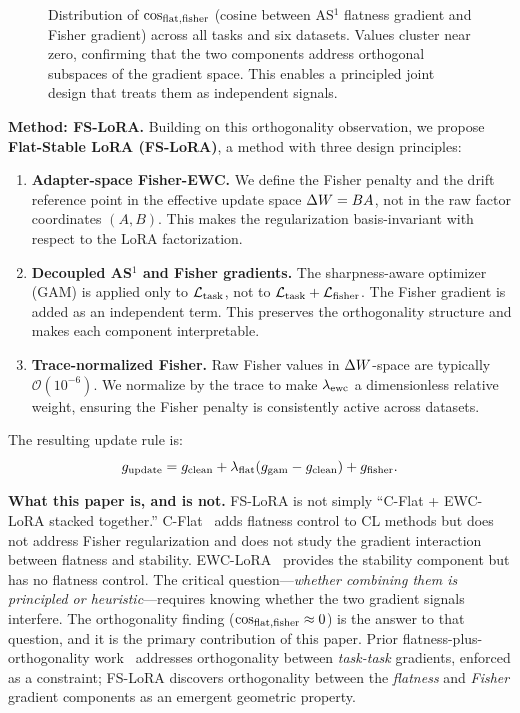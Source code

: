 \begin{figure}[t]
\centering
\fbox{\rule[-.5cm]{0cm}{4cm} \rule[-.5cm]{8cm}{0cm}}
\caption{Distribution of $\cos_{\mathrm{flat,fisher}}$ (cosine between AS$^1$ flatness gradient and Fisher gradient)
across all tasks and six datasets. Values cluster near zero, confirming that the two components
address orthogonal subspaces of the gradient space. This enables a principled joint design
that treats them as independent signals.}
\label{fig:cosine_histogram}
\end{figure}

\textbf{Method: FS-LoRA.}
Building on this orthogonality observation, we propose \textbf{Flat-Stable LoRA (FS-LoRA)},
a method with three design principles:
\begin{enumerate}
  \item \textbf{Adapter-space Fisher-EWC.}
    We define the Fisher penalty and the drift reference point in the effective update space
    $\Delta W = BA$, not in the raw factor coordinates $(A, B)$.
    This makes the regularization basis-invariant with respect to the LoRA factorization.
  \item \textbf{Decoupled AS$^1$ and Fisher gradients.}
    The sharpness-aware optimizer (GAM) is applied only to $\mathcal{L}_{\mathrm{task}}$, not to
    $\mathcal{L}_{\mathrm{task}} + \mathcal{L}_{\mathrm{fisher}}$.
    The Fisher gradient is added as an independent term.
    This preserves the orthogonality structure and makes each component interpretable.
  \item \textbf{Trace-normalized Fisher.}
    Raw Fisher values in $\Delta W$-space are typically $\mathcal{O}(10^{-6})$.
    We normalize by the trace to make $\lambda_{\mathrm{ewc}}$ a dimensionless relative weight,
    ensuring the Fisher penalty is consistently active across datasets.
\end{enumerate}

The resulting update rule is:
\begin{equation}
  g_{\mathrm{update}} = g_{\mathrm{clean}} + \lambda_{\mathrm{flat}}(g_{\mathrm{gam}} - g_{\mathrm{clean}}) + g_{\mathrm{fisher}}.
  \label{eq:update_rule}
\end{equation}

\textbf{What this paper is, and is not.}
FS-LoRA is not simply ``C-Flat + EWC-LoRA stacked together.''
C-Flat~\citep{NEURIPS2024_C-Flat} adds flatness control to CL methods but does not address Fisher
regularization and does not study the gradient interaction between flatness and stability.
EWC-LoRA~\citep{zheng2025ewclora} provides the stability component but has no flatness control.
The critical question---\emph{whether combining them is principled or heuristic}---requires knowing
whether the two gradient signals interfere.
The orthogonality finding ($\cos_{\mathrm{flat,fisher}} \approx 0$) is the answer to that question,
and it is the primary contribution of this paper.
Prior flatness-plus-orthogonality work~\citep{yangRevisitingFlatnessAwareOptimization2025,garg2026fopng}
addresses orthogonality between \emph{task-task} gradients, enforced as a constraint;
FS-LoRA discovers orthogonality between the \emph{flatness} and \emph{Fisher} gradient components
as an emergent geometric property.

